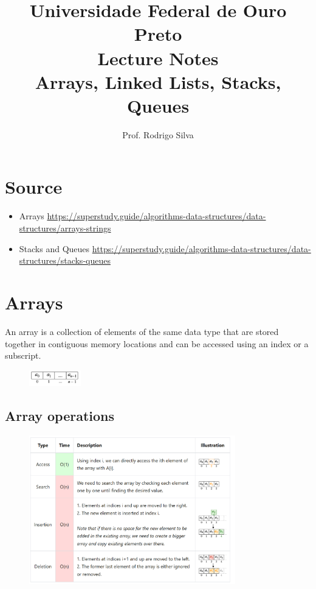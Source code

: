 \documentclass{article}
\title{\vspace{-2 cm}Universidade Federal de Ouro Preto \\ Lecture Notes \\ Arrays, Linked Lists, Stacks, Queues}
\author{Prof. Rodrigo Silva}
\begin{document}
\maketitle

\section*{Source}

\begin{itemize}
    \item Arrays \url{https://superstudy.guide/algorithms-data-structures/data-structures/arrays-strings}
    \item Stacks and Queues \url{https://superstudy.guide/algorithms-data-structures/data-structures/stacks-queues}
\end{itemize}

\section{Arrays}

An array is a collection of elements of the same data type that are stored together in contiguous memory locations and can be accessed using an index or a subscript.

\begin{figure}[!ht]
    \centering
    \includegraphics*[width=0.2\textwidth]{images/array.png}
\end{figure}

\subsection{Array operations}

\begin{figure}[!ht]
    \centering
    \includegraphics*[width=0.8\textwidth]{images/array_operations.png}
\end{figure}
\end{document}
